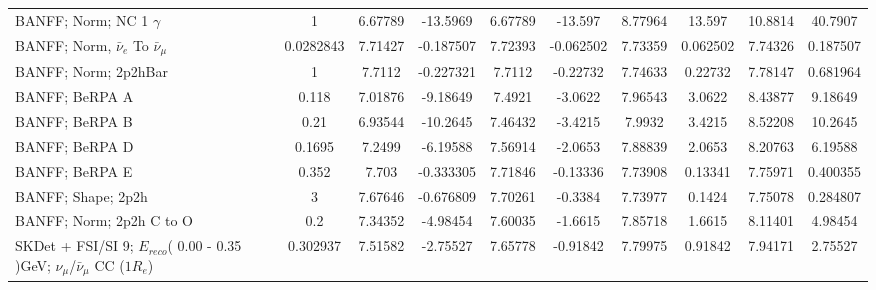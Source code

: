 \documentclass{standalone}
\begin{document}
\begin{tabular}{| l | S | S  S | S  S | S  S | S  S | }
                                                      BANFF; Norm; NC 1 $\gamma$ &               1 &         6.67789 &        -13.5969 &         6.67789 &         -13.597 &         8.77964 &          13.597 &         10.8814 &         40.7907 \\ 
                               BANFF; Norm, $\bar{\nu}_{e}$ To $\bar{\nu}_{\mu}$ &       0.0282843 &         7.71427 &       -0.187507 &         7.72393 &       -0.062502 &         7.73359 &        0.062502 &         7.74326 &        0.187507 \\ 
                                                            BANFF; Norm; 2p2hBar &               1 &          7.7112 &       -0.227321 &          7.7112 &        -0.22732 &         7.74633 &         0.22732 &         7.78147 &        0.681964 \\ 
                                                                  BANFF; BeRPA A &           0.118 &         7.01876 &        -9.18649 &          7.4921 &         -3.0622 &         7.96543 &          3.0622 &         8.43877 &         9.18649 \\ 
                                                                  BANFF; BeRPA B &            0.21 &         6.93544 &        -10.2645 &         7.46432 &         -3.4215 &          7.9932 &          3.4215 &         8.52208 &         10.2645 \\ 
                                                                  BANFF; BeRPA D &          0.1695 &          7.2499 &        -6.19588 &         7.56914 &         -2.0653 &         7.88839 &          2.0653 &         8.20763 &         6.19588 \\ 
                                                                  BANFF; BeRPA E &           0.352 &           7.703 &       -0.333305 &         7.71846 &        -0.13336 &         7.73908 &         0.13341 &         7.75971 &        0.400355 \\ 
                                                              BANFF; Shape; 2p2h &               3 &         7.67646 &       -0.676809 &         7.70261 &         -0.3384 &         7.73977 &          0.1424 &         7.75078 &        0.284807 \\ 
                                                        BANFF; Norm; 2p2h C to O &             0.2 &         7.34352 &        -4.98454 &         7.60035 &         -1.6615 &         7.85718 &          1.6615 &         8.11401 &         4.98454 \\ 
SKDet + FSI/SI  9; $E_{reco}$( 0.00 - 0.35 )GeV; $\nu_{\mu}$/$\bar{\nu}_{\mu}$ CC ($1R_{e}$) &        0.302937 &         7.51582 &        -2.75527 &         7.65778 &        -0.91842 &         7.79975 &         0.91842 &         7.94171 &         2.75527 \\ 

\end{tabular}
\end{document}
